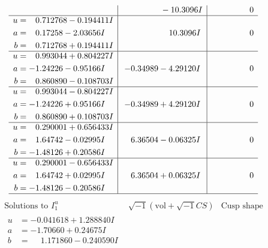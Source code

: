 \documentclass[1p]{elsarticle_modified}
\theoremstyle{definition}
\newcommand{\I}{\sqrt{-1}}
\begin{document}
$$\begin{array}{c|c|c}
 & \phantom{-0.000000 } -10.3096 I & \phantom{-0.000000 } 0 \\ \hline\begin{aligned}
u &= \phantom{-}0.712768 - 0.194411 I \\
a &= \phantom{-}0.17258 - 2.03656 I \\
b &= \phantom{-}0.712768 + 0.194411 I\end{aligned}
 & \phantom{-0.000000 -}10.3096 I & \phantom{-0.000000 } 0 \\ \hline\begin{aligned}
u &= \phantom{-}0.993044 + 0.804227 I \\
a &= -1.24226 - 0.95166 I \\
b &= \phantom{-}0.860890 - 0.108703 I\end{aligned}
 & -0.34989 - 4.29120 I & \phantom{-0.000000 } 0 \\ \hline\begin{aligned}
u &= \phantom{-}0.993044 - 0.804227 I \\
a &= -1.24226 + 0.95166 I \\
b &= \phantom{-}0.860890 + 0.108703 I\end{aligned}
 & -0.34989 + 4.29120 I & \phantom{-0.000000 } 0 \\ \hline\begin{aligned}
u &= \phantom{-}0.290001 + 0.656433 I \\
a &= \phantom{-}1.64742 - 0.02995 I \\
b &= -1.48126 + 0.20586 I\end{aligned}
 & \phantom{-}6.36504 - 0.06325 I & \phantom{-0.000000 } 0 \\ \hline\begin{aligned}
u &= \phantom{-}0.290001 - 0.656433 I \\
a &= \phantom{-}1.64742 + 0.02995 I \\
b &= -1.48126 - 0.20586 I\end{aligned}
 & \phantom{-}6.36504 + 0.06325 I & \phantom{-0.000000 } 0\\
 \hline 
 \end{array}$$\newpage$$\begin{array}{c|c|c}  
\text{Solutions to }I^u_{1}& \I (\text{vol} + \sqrt{-1}CS) & \text{Cusp shape}\\
 \hline 
\begin{aligned}
u &= -0.041618 + 1.288840 I \\
a &= -1.70660 + 0.24675 I \\
b &= \phantom{-}1.171860 - 0.240590 I\end{aligned}

\end{array}$$
\end{document}
